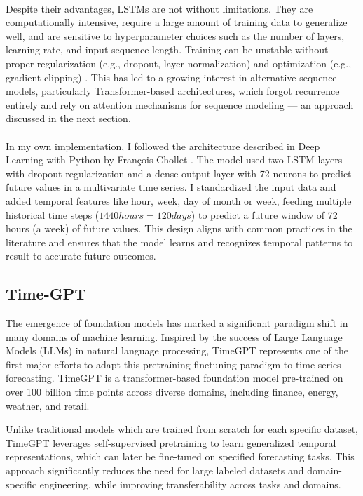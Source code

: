 \documentclass{article}
\begin{document}
\\
Despite their advantages, LSTMs are not without limitations. They are computationally intensive, require a large amount of training data to generalize well, and are sensitive to hyperparameter choices such as the number of layers, learning rate, and input sequence length. Training can be unstable without proper regularization (e.g., dropout, layer normalization) and optimization (e.g., gradient clipping) \cite{vanishinggradientwiki2019,ghojogh2023rnnsurvey}. This has led to a growing interest in alternative sequence models, particularly Transformer-based architectures, which forgot recurrence entirely and rely on attention mechanisms for sequence modeling — an approach discussed in the next section.\\
\\
In my own implementation, I followed the architecture described in Deep Learning with Python by François Chollet \cite{Francois}. The model used two LSTM layers with dropout regularization and a dense output layer with 72 neurons to predict future values in a multivariate time series. I standardized the input data and added temporal features like hour, week, day of month or week, feeding multiple historical time steps ($1440 hours = 120days$) to predict a future window of 72 hours (a week) of future values. This design aligns with common practices in the literature and ensures that the model learns and recognizes temporal patterns to result to accurate future outcomes.

\subsection{Time-GPT}
The emergence of foundation models has marked a significant paradigm shift in many domains of machine learning. Inspired by the success of Large Language Models (LLMs) in natural language processing, TimeGPT represents one of the first major efforts to adapt this pretraining-finetuning paradigm to time series forecasting. TimeGPT is a transformer-based foundation model pre-trained on over 100 billion time points across diverse domains, including finance, energy, weather, and retail. \cite{garza2023timegpt1}

Unlike traditional models which are trained from scratch for each specific dataset, TimeGPT leverages self-supervised pretraining to learn generalized temporal representations, which can later be fine-tuned on specified forecasting tasks. This approach significantly reduces the need for large labeled datasets and domain-specific engineering, while improving transferability across tasks and domains.
\end{document}
